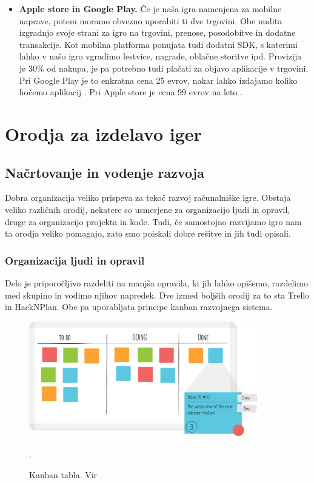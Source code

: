 \documentclass[12pt,a4paper,twoside]{book}
\begin{document}
\begin{itemize}
	\item \textbf{Apple store in Google Play.} Če je naša igra namenjena za mobilne naprave, potem moramo obvezno uporabiti ti dve trgovini. Obe nudita izgradnjo svoje strani za igro na trgovini, prenose, posodobitve in dodatne transakcije. Kot mobilna platforma ponujata tudi dodatni SDK, s katerimi lahko v našo igro vgradimo lestvice, nagrade, oblačne storitve ipd. Provizija je 30\% od nakupa, je pa potrebno tudi plačati za objavo aplikacije v trgovini. Pri Google Play je to enkratna cena 25 evrov, nakar lahko izdajamo koliko hočemo aplikacij \cite{googleplay}. Pri Apple store je cena 99 evrov na leto \cite{applestore}.
\end{itemize} 

\chapter{Orodja za izdelavo iger}\thispagestyle{fancy}
\section{Načrtovanje in vodenje razvoja}
Dobra organizacija veliko prispeva za tekoč razvoj računalniške igre. Obstaja veliko različnih orodij, nekatere so usmerjene za organizacijo ljudi in opravil, druge za organizacijo projekta in kode. Tudi, če samostojno razvijamo igro nam ta orodja veliko pomagajo, zato smo poiskali dobre rešitve in jih tudi opisali.

\subsection{Organizacija ljudi in opravil}
Delo je priporočljivo razdeliti na manjša opravila, ki jih lahko opišemo, razdelimo med skupino in vodimo njihov napredek. Dve izmed boljših orodij za to sta Trello in HackNPlan. Obe pa uporabljata principe kanban razvojnega sistema.

\begin{figure}[h]
	\centering
	\includegraphics[width=10cm]{kanban_guide_print_KPO_bleed_board2}
	\caption{Kanban tabla. Vir \cite{kanbanBoard}}.
	\label{slika:kanbanBoard}
	\vspace*{-2em}
\end{figure}
\end{document}

